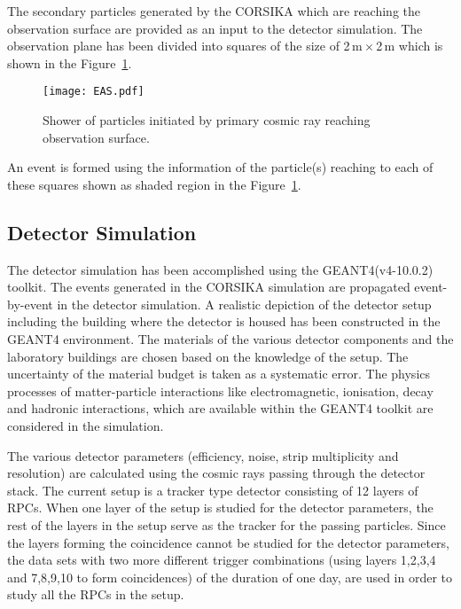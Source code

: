 The secondary particles generated by the CORSIKA which are reaching
the observation surface are provided as an input to the detector
simulation. The observation plane has been divided
into squares of the size of 2\,m\,$\times$\,2\,m which is shown in the
Figure~\ref{fig:eas}.
\begin{figure}[h]
  \centering
  \texttt{[image: EAS.pdf]} 
  \caption{Shower of particles initiated by primary cosmic ray
    reaching observation surface.}
  \label{fig:eas}
\end{figure}
An event is formed using the information of the particle(s) reaching
to each of these squares shown as shaded region in the
Figure~\ref{fig:eas}.


\subsection{Detector Simulation}
The detector simulation has been accomplished using the
GEANT4(v4-10.0.2) toolkit. The events generated in the CORSIKA
simulation are propagated event-by-event in the detector simulation.
A realistic depiction of the detector setup including the building
where the detector is housed has been constructed in the GEANT4
environment. The materials of the various detector components and
the laboratory buildings are chosen based on the knowledge of the
setup. The uncertainty of the material budget is taken as a systematic
error. The physics processes of matter-particle interactions 
like electromagnetic, ionisation, decay and hadronic interactions,
which are available within the GEANT4 toolkit are considered in the
simulation.

The various detector parameters (efficiency, noise, strip
multiplicity and resolution) are calculated using the cosmic rays
passing through the detector stack.
The current setup is a tracker type detector consisting of 12 layers
of RPCs. When one layer of the setup is studied for the detector
parameters, the rest of the layers in the setup serve as the tracker
for the passing particles. Since the layers forming the coincidence
cannot be studied for the detector parameters, the data sets with two
more different trigger combinations (using layers 1,2,3,4 and 7,8,9,10
to form coincidences) of the duration of one day, are used in order
to study all the RPCs in the setup.

